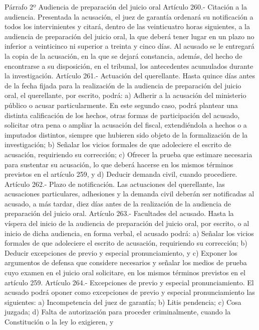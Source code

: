     Párrafo 2º Audiencia de preparación del juicio oral
    Artículo 260.- Citación a la audiencia. Presentada la acusación, el juez de garantía ordenará su notificación a todos los intervinientes y citará, dentro de las veinticuatro horas siguientes, a la audiencia de preparación del juicio oral, la que deberá tener lugar en un plazo no inferior a veinticinco ni superior a treinta y cinco días. Al acusado se le entregará la copia de la acusación, en la que se dejará constancia, además, del hecho de encontrarse a su disposición, en el tribunal, los antecedentes acumulados durante la investigación.
    Artículo 261.- Actuación del querellante. Hasta quince días antes de la fecha fijada para la realización de la audiencia de preparación del juicio oral, el querellante, por escrito, podrá:
    a) Adherir a la acusación del ministerio público o acusar particularmente. En este segundo caso, podrá plantear una distinta calificación de los hechos, otras formas de participación del acusado, solicitar otra pena o ampliar la acusación del fiscal, extendiéndola a hechos o a imputados distintos, siempre que hubieren sido objeto de la formalización de la investigación;
    b) Señalar los vicios formales de que adoleciere el escrito de acusación, requiriendo su corrección;
    c) Ofrecer la prueba que estimare necesaria para sustentar su acusación, lo que deberá hacerse en los mismos términos previstos en el artículo 259, y d) Deducir demanda civil, cuando procediere.
    Artículo 262.- Plazo de notificación. Las actuaciones del querellante, las acusaciones particulares, adhesiones y la demanda civil deberán ser notificadas al acusado, a más tardar, diez días antes de la realización de la audiencia de preparación del juicio oral.
    Artículo 263.- Facultades del acusado. Hasta la víspera del inicio de la audiencia de preparación del juicio oral, por escrito, o al inicio de dicha audiencia, en forma verbal, el acusado podrá:
    a) Señalar los vicios formales de que adoleciere el escrito de acusación, requiriendo su corrección;
    b) Deducir excepciones de previo y especial pronunciamiento, y
    c) Exponer los argumentos de defensa que considere necesarios y señalar los medios de prueba cuyo examen en el juicio oral solicitare, en los mismos términos previstos en el artículo 259.
    Artículo 264.- Excepciones de previo y especial pronunciamiento. El acusado podrá oponer como excepciones de previo y especial pronunciamiento las siguientes:
    a) Incompetencia del juez de garantía;
    b) Litis pendencia;
    c) Cosa juzgada;
    d) Falta de autorización para proceder criminalmente, cuando la Constitución o la ley lo exigieren, y
